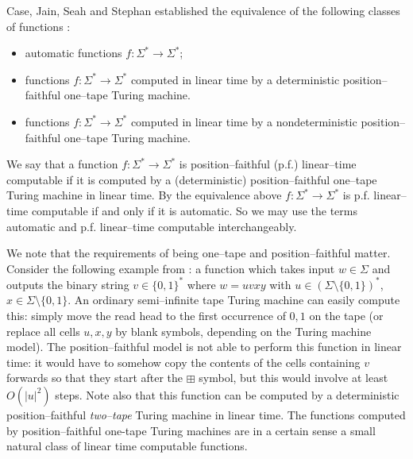 \documentclass[article,12pt]{elsarticle}
\begin{document}
Case, Jain, Seah and Stephan established the equivalence
of the following classes of functions \cite{Stephan_lmcs_13}:
\begin{itemize} 
	\item {automatic functions 
		$f: \Sigma^* \rightarrow \Sigma^*$;} 
	\item{functions $f: \Sigma^* \rightarrow \Sigma^*$ 
		computed in linear time by a 
		deterministic position--faithful one--tape Turing machine.}  
				\item{functions  $f: \Sigma^* \rightarrow \Sigma^*$  computed in linear time 
			by a nondeterministic position--faithful
			one--tape Turing machine.}   
\end{itemize} 
We say that a function 
$f: \Sigma^* \rightarrow \Sigma^*$ is 
position--faithful (p.f.) linear--time computable if it is computed 
by a (deterministic) position--faithful 
one--tape Turing machine in linear time. 
By the equivalence above 
$f : \Sigma^* \rightarrow \Sigma^*$
is  p.f. linear--time computable if and only if 
it is automatic. So we may use the terms  
automatic and p.f. linear--time computable interchangeably. 
  


We note that the requirements 
of being one--tape and  
position--faithful matter.
Consider the following example 
from \cite[p.~4]{Stephan_lmcs_13}: a function which takes input $w\in \Sigma$ and outputs the binary string $v\in\{0,1\}^*$ where $w=uvxy$ with $u\in (\Sigma\setminus\{0,1\})^*$, $x\in\Sigma\setminus\{0,1\}$. An ordinary semi--infinite tape Turing machine can easily compute this: simply move the read head to the first occurrence of $0,1$ on the tape (or replace all cells $u,x,y$ by blank symbols, depending on the Turing machine model). The position--faithful model is not able to perform this function in linear time: it would have to somehow copy the contents of the cells containing $v$ forwards so that they start after the $\boxplus$ symbol, but this would involve at least $O(|u|^2)$ steps.
Note also that this 
function can be computed by a 
deterministic position--faithful {\em two--tape} Turing 
machine in linear time.     
The functions
computed by position--faithful one-tape Turing machines are in a certain sense a small natural class of linear time computable functions. 
\end{document}
